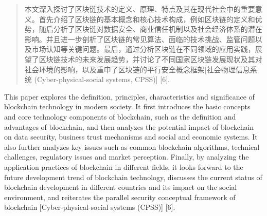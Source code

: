 

\begin{abstract}
  本文深入探讨了区块链技术的定义、原理、特点及其在现代社会中的重要意义。首先介绍了区块链的基本概念和核心技术构成，例如区块链的定义和优势，随后分析了区块链对数据安全、商业信任机制以及社会经济体系的潜在影响。并且进一步剖析了区块链的常见算法、面临的技术挑战、监管问题以及市场认知等关键问题。最后，通过分析区块链在不同领域的应用实践，展望了区块链技术的未来发展趋势，并讨论了不同国家区块链发展现状及其对社会环境的影响，以及重申了区块链的平行安全概念框架[社会物理信息系统 (Cyber-physical-social systems, CPSS)] [6].
\end{abstract}

\begin{abstract*}
  This paper explores the definition, principles, characteristics and significance of blockchain technology in modern society. It first introduces the basic concepts and core technology components of blockchain, such as the definition and advantages of blockchain, and then analyzes the potential impact of blockchain on data security, business trust mechanisms and social and economic systems. It also further analyzes key issues such as common blockchain algorithms, technical challenges, regulatory issues and market perception. Finally, by analyzing the application practices of blockchain in different fields, it looks forward to the future development trend of blockchain technology, discusses the current status of blockchain development in different countries and its impact on the social environment, and reiterates the parallel security conceptual framework of blockchain [Cyber-physical-social systems (CPSS)] [6].
\end{abstract*}
